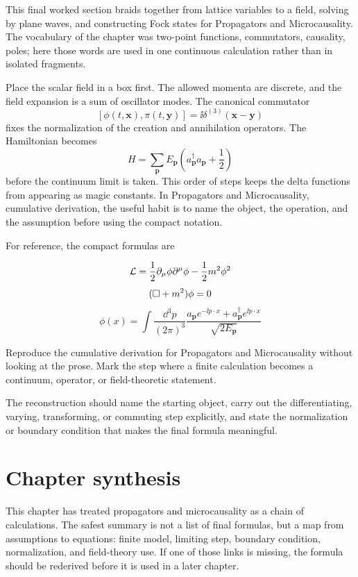 This final worked section braids together from lattice variables to a field, solving by plane waves, and constructing Fock states for Propagators and Microcausality.  The vocabulary of the chapter was two-point functions, commutators, causality, poles; here those words are used in one continuous calculation rather than in isolated fragments.

Place the scalar field in a box first.  The allowed momenta are discrete, and the field expansion is a sum of oscillator modes.  The canonical commutator
\[
  [\phi(t,\bm x),\pi(t,\bm y)]=\ii\delta^{(3)}(\bm x-\bm y)
\]
fixes the normalization of the creation and annihilation operators.  The Hamiltonian becomes
\[
  H=\sum_{\bm p}E_{\bm p}\left(a_{\bm p}^\dagger a_{\bm p}+\frac12\right)
\]
before the continuum limit is taken.  This order of steps keeps the delta functions from appearing as magic constants.  In Propagators and Microcausality, cumulative derivation, the useful habit is to name the object, the operation, and the assumption before using the compact notation.

For reference, the compact formulas are

\[
  \mathcal L=\frac12\partial_\mu\phi\partial^\mu\phi-\frac12m^2\phi^2
\]
\[
  (\Box+m^2)\phi=0
\]
\[
  \phi(x)=\int\frac{\dd^3p}{(2\pi)^3}\frac{a_{\bm p}e^{-\ii p\cdot x}+a_{\bm p}^\dagger e^{\ii p\cdot x}}{\sqrt{2E_{\bm p}}}
\]

\begin{exercise}
Reproduce the cumulative derivation for Propagators and Microcausality without looking at the prose.  Mark the step where a finite calculation becomes a continuum, operator, or field-theoretic statement.
\begin{answer}
The reconstruction should name the starting object, carry out the differentiating, varying, transforming, or commuting step explicitly, and state the normalization or boundary condition that makes the final formula meaningful.
\end{answer}
\end{exercise}



\section{Chapter synthesis}

This chapter has treated propagators and microcausality as a chain of calculations.  The safest summary is not a list of final formulas, but a map from assumptions to equations: finite model, limiting step, boundary condition, normalization, and field-theory use.  If one of those links is missing, the formula should be rederived before it is used in a later chapter.

